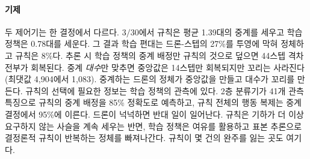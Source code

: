 \documentclass[final,5p,times,twocolumn]{elsarticle}
\begin{document}
\begin{table}[t]
\centering
\caption{제안 정책에 추론 시점에서 교착 복구 덮어쓰기를 씌운 효과, 재학습 없음. 쌍별 중앙값과
승--패, $p$는 같은 인스턴스에서 튜닝된 규칙에 대한 것이고, 표준편차·90분위·최대·1{,}500스텝
초과 횟수는 학습 정책 자신의 makespan 분포다.}
\label{tab:stab}
\small

\end{table}

\paragraph{기제}
두 제어기는 한 결정에서 다르다. $3/30$에서 규칙은 평균 1.39대의 중계를 세우고 학습 정책은
0.78대를 세운다. 그 결과 학습 편대는 드론-스텝의 27\%를 투영에 막혀 정체하고 규칙은 8\%다.
추론 시 학습 정책의 중계 배정만 규칙의 것으로 덮으면 44스텝 격차 전부가 회복된다. 중계
\emph{대수}만 맞추면 중앙값은 14스텝만 회복되지만 꼬리는 사라진다(최댓값 4{,}904에서 1{,}083).
중계하는 드론의 정체가 중앙값을 만들고 대수가 꼬리를 만든다. 규칙의 선택에 필요한 정보는
학습 정책의 관측에 있다. 2층 분류기가 41개 관측 특징으로 규칙의 중계 배정을 85\% 정확도로
예측하고, 규칙 전체의 행동 복제는 중계 결정에서 95\%에 이른다. 드론이 넉넉하면 반대 일이
일어난다. 규칙은 기하가 더 이상 요구하지 않는 사슬을 계속 세우는 반면, 학습 정책은 여유를
활용하고 표본 추론으로 결정론적 규칙이 반복하는 정체를 빠져나간다. 규칙이 몇 건의 완주를 잃는
곳도 여기다.
\end{document}
